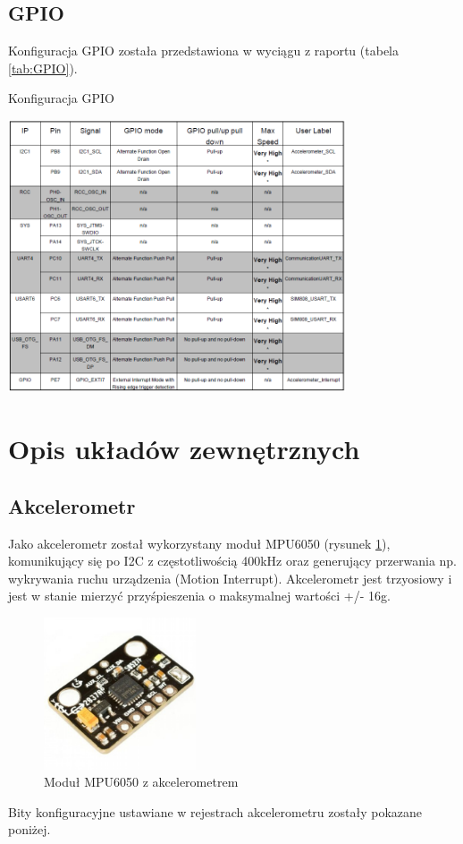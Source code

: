 \documentclass[10pt, a4paper]{article}
\begin{document}
\subsection{GPIO}
Konfiguracja GPIO została przedstawiona w wyciągu z raportu (tabela \ref{tab:GPIO}).
\begin{table}[!htb]
\centering
\caption{Konfiguracja GPIO\label{tab:GPIO}}
\includegraphics[width=0.75\textwidth]{./KonfiguracjaGPIOR.PNG}
\end{table}
\newpage
\section{Opis układów zewnętrznych}
\subsection{Akcelerometr}
Jako akcelerometr został wykorzystany moduł MPU6050 (rysunek \ref{fig:mpu6050}), komunikujący się po I2C z częstotliwością 400kHz oraz generujący przerwania np. wykrywania ruchu urządzenia (Motion Interrupt). Akcelerometr jest trzyosiowy i jest w stanie mierzyć przyśpieszenia o maksymalnej wartości +/- 16g. 
\begin{figure}[!htb]
\centering
\includegraphics[width=0.4\textwidth]{./mpu6050.PNG}
\caption{Moduł MPU6050 z akcelerometrem\label{fig:mpu6050}}
\end{figure}
Bity konfiguracyjne ustawiane w rejestrach akcelerometru zostały pokazane poniżej.

\newpage
\end{document}
